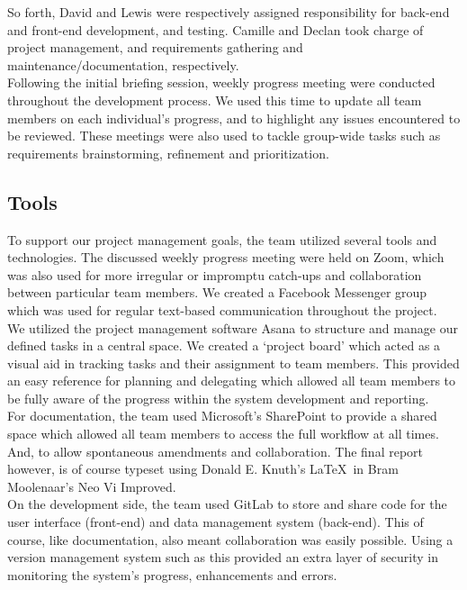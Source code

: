 \documentclass[11pt, english]{article}
\begin{document}
	So forth, David and Lewis were respectively assigned responsibility for back-end and front-end development, and testing. Camille and Declan took charge of project management, and requirements gathering and maintenance/documentation, respectively.\\

	Following the initial briefing session, weekly progress meeting were conducted throughout the development process. We used this time to update all team members on each individual's progress, and to highlight any issues encountered to be reviewed. These meetings were also used to tackle group-wide tasks such as requirements brainstorming, refinement and prioritization.

	\subsection{Tools}

	To support our project management goals, the team utilized several tools and technologies. The discussed weekly progress meeting were held on Zoom, which was also used for more irregular or impromptu catch-ups and collaboration between particular team members. We created a Facebook Messenger group which was used for regular text-based communication throughout the project.\\

	We utilized the project management software Asana to structure and manage our defined tasks in a central space. We created a `project board' which acted as a visual aid in tracking tasks and their assignment to team members. This provided an easy reference for planning and delegating which allowed all team members to be fully aware of the progress within the system development and reporting.\\

	For documentation, the team used Microsoft's SharePoint to provide a shared space which allowed all team members to access the full workflow at all times. And, to allow spontaneous amendments and collaboration. The final report however, is of course typeset using Donald E. Knuth's \LaTeX\ in Bram Moolenaar's Neo Vi Improved.\\

	On the development side, the team used GitLab to store and share code for the user interface (front-end) and data management system (back-end). This of course, like documentation, also meant collaboration was easily possible. Using a version management system such as this provided an extra layer of security in monitoring the system's progress, enhancements and errors.
\end{document}

